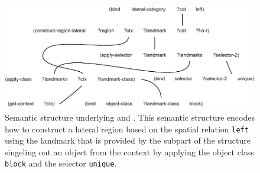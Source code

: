 \begin{figure}
\begin{center}
\includegraphics[width=1.0\columnwidth]{figs/semantic-structure-links-des-blockes}
\end{center}
\caption[Semantic structure example lateral region with landmark]{%
Semantic structure underlying 
and . This semantic structure encodes how to construct
a lateral region based on the spatial relation {\footnotesize\tt left} using the landmark 
that is provided by the subpart of the structure singeling out an object from the context
by applying the object class {\footnotesize\tt block} and the selector {\footnotesize\tt unique}.}
\label{f:semantic-structure-2}
\end{figure}
